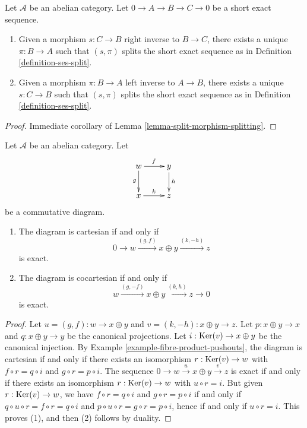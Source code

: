 \begin{lemma}
\label{lemma-ses-split}
Let $\mathcal{A}$ be an abelian category.
Let $0 \to A \to B \to C \to 0$
be a short exact sequence.
\begin{enumerate}
\item Given a morphism $s : C \to B$ right inverse to
$B \to C$, there exists a unique $\pi : B \to A$
such that $(s, \pi)$ splits the short exact sequence
as in Definition \ref{definition-ses-split}.
\item Given a morphism $\pi : B \to A$ left inverse to
$A \to B$, there exists a unique $s : C \to B$
such that $(s, \pi)$ splits the short exact sequence
as in Definition \ref{definition-ses-split}.
\end{enumerate}
\end{lemma}

\begin{proof}
Immediate corollary of Lemma \ref{lemma-split-morphism-splitting}.
\end{proof}

\begin{lemma}
\label{lemma-characterize-cartesian}
Let $\mathcal{A}$ be an abelian category. Let
$$
\xymatrix{
w\ar[r]^f\ar[d]_g
& y\ar[d]^h\\
x\ar[r]^k
& z
}
$$
be a commutative diagram. 
\begin{enumerate}
\item The diagram is cartesian if and only if 
$$
0 \to w \xrightarrow{(g, f)} x \oplus y \xrightarrow{(k, -h)} z
$$
is exact.
\item The diagram is cocartesian if and only if 
$$
w \xrightarrow{(g, -f)} x \oplus y \xrightarrow{(k, h)} z \to 0
$$
is exact.
\end{enumerate}
\end{lemma}

\begin{proof}
Let $u = (g, f) : w \to x \oplus y$ and $v = (k, -h) : x \oplus y \to z$. 
Let $p : x \oplus y \to x$ and $q : x \oplus y \to y$ be the canonical 
projections. Let $i : \mathop{\mathrm{Ker}}(v) \to x \oplus y$ be the canonical 
injection. By Example \ref{example-fibre-product-pushouts}, the diagram is 
cartesian if and only if there exists an isomorphism 
$r : \mathop{\mathrm{Ker}}(v) \to w$ with $f \circ r = q \circ i$ and 
$g \circ r = p \circ i$. The sequence 
$0 \to w \overset{u} \to x \oplus y \overset{v} \to z$ is exact if and 
only if there exists an isomorphism $r : \mathop{\mathrm{Ker}}(v) \to w$ with 
$u \circ r = i$. But given $r : \mathop{\mathrm{Ker}}(v) \to w$, we have 
$f \circ r = q \circ i$ and $g \circ r = p \circ i$ if and 
only if $q \circ u \circ r= f \circ r = q \circ i$ and 
$p \circ u \circ r = g \circ r = p \circ i$, hence if and only if
$u \circ r = i$. This proves (1), and then (2) follows by duality. 
\end{proof}

